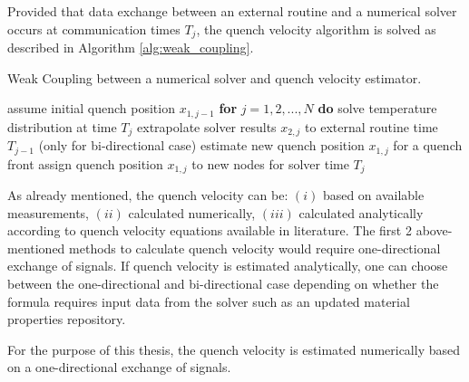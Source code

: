 Provided that data exchange between an external routine and a numerical solver occurs at communication times $T_j$, the quench velocity algorithm is solved as described in Algorithm \ref{alg:weak_coupling}.

\begin{algorithm}
  \caption{Weak Coupling between a numerical solver and quench velocity estimator.}
  \label{alg:weak_coupling}
  \begin{algorithmic}[1]
    \STATE assume initial quench position $x_{1,j-1}$ 
    \STATE \textbf{for} $j=1,2,...,N$ \textbf{do}
    \STATE \hspace{0.5cm} solve temperature distribution at time $T_j$
    \STATE \hspace{0.5cm} extrapolate solver results $x_{2,j}$ to external routine time $T_{j-1}$ (only for bi-directional case)
    \STATE \hspace{0.5cm} estimate new quench position $x_{1,j}$ for a quench front
    \STATE \hspace{0.5cm} assign quench position $x_{1,j}$ to new nodes for solver time  $T_j$
  \end{algorithmic}
\end{algorithm}

As already mentioned, the quench velocity can be: $(i)$ based on available measurements, $(ii)$ calculated numerically, $(iii)$ calculated analytically according to quench velocity equations available in literature. The first 2 above-mentioned methods to calculate quench velocity would require one-directional exchange of signals. If quench velocity is estimated analytically, one can choose between the one-directional and bi-directional case depending on whether the formula requires input data from the solver such as an updated material properties repository.

For the purpose of this thesis, the quench velocity is estimated numerically based on a one-directional exchange of signals.
